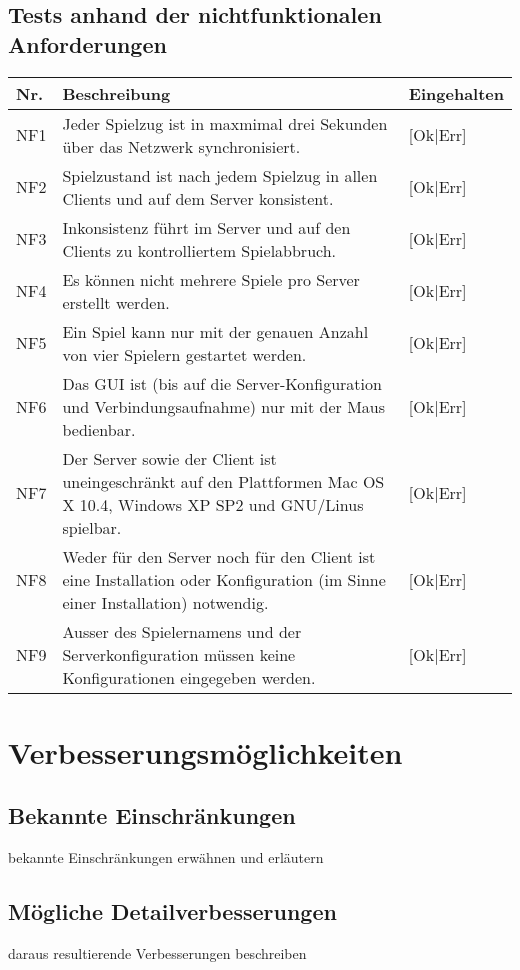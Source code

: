 \documentclass[a4paper,12pt,halfparskip,DIV14]{scrartcl}
\begin{document}

\subsection{Tests anhand der nichtfunktionalen Anforderungen}\label{sub:tests_anhand_der_nichtfunktionalen_anforderungen} %
\begin {tabular}{l p{12cm} l}
\toprule
\textbf{Nr.} & \textbf{Beschreibung} & \textbf{Eingehalten} \\
\midrule
NF1 & Jeder Spielzug ist in maxmimal drei Sekunden über das Netzwerk synchronisiert. & [Ok|Err] \\
NF2 & Spielzustand ist nach jedem Spielzug in allen Clients und auf dem Server konsistent. & [Ok|Err] \\
NF3 & Inkonsistenz führt im Server und auf den Clients zu kontrolliertem Spielabbruch. & [Ok|Err] \\
NF4 & Es können nicht mehrere Spiele pro Server erstellt werden. & [Ok|Err] \\
NF5 & Ein Spiel kann nur mit der genauen Anzahl von vier Spielern gestartet werden. & [Ok|Err] \\
NF6 & Das GUI ist (bis auf die Server-Konfiguration und Verbindungsaufnahme) nur mit der Maus bedienbar. & [Ok|Err] \\
NF7 & Der Server sowie der Client ist uneingeschränkt auf den Plattformen Mac OS X 10.4, Windows XP SP2 und GNU/Linus spielbar. & [Ok|Err] \\
NF8 & Weder für den Server noch für den Client ist eine Installation oder Konfiguration (im Sinne einer Installation) notwendig. & [Ok|Err] \\
NF9 & Ausser des Spielernamens und der Serverkonfiguration müssen keine Konfigurationen eingegeben werden. & [Ok|Err] \\
\bottomrule
\end{tabular}



\section{Verbesserungsmöglichkeiten} %
\label{sec:verbesserungsmöglichkeiten}
\subsection{Bekannte Einschränkungen} %
\label{sub:bekannte_einschränkungen}
bekannte Einschränkungen erwähnen und erläutern
\subsection{Mögliche Detailverbesserungen} %
\label{sub:mögliche_detailverbesserungen}
daraus resultierende Verbesserungen beschreiben
\end{document}
